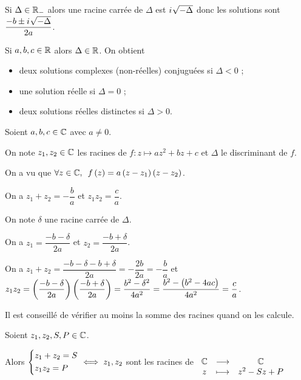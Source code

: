 \begin{rem}
Si \(\Delta\in\mathbb{R}_-\) alors une racine carrée de \(\Delta\) est \(i\mkern1mu\sqrt{-\Delta}\) donc les solutions sont \(\dfrac{-b\pm i\mkern1mu\sqrt{-\Delta}}{2a}\).
\end{rem}

\begin{rem}
Si \(a,b,c\in\mathbb{R}\) alors \(\Delta\in\mathbb{R}\). On obtient \begin{itemize}
\item deux solutions complexes (non-réelles) conjuguées si \(\Delta<0\) ;

\item une solution réelle si \(\Delta=0\) ;

\item deux solutions réelles distinctes si \(\Delta>0\).
\end{itemize}
\end{rem}

\begin{prop}
Soient \(a,b,c\in\mathbb{C}\) avec \(a\not=0\).

On note \(z_1,z_2\in\mathbb{C}\) les racines de \(f:z\mapsto az^2+bz+c\) et \(\Delta\) le discriminant de \(f\).

On a vu que \(\quantifs{\forall z\in\C}f\paren{z}=a\paren{z-z_1}\paren{z-z_2}\).

On a \(z_1+z_2=-\dfrac{b}{a}\) et \(z_1z_2=\dfrac{c}{a}\).
\end{prop}

\begin{dem}
On note \(\delta\) une racine carrée de \(\Delta\).

On a \(z_1=\dfrac{-b-\delta}{2a}\) et \(z_2=\dfrac{-b+\delta}{2a}\).

On a \(z_1+z_2=\dfrac{-b-\delta-b+\delta}{2a}=-\dfrac{2b}{2a}=-\dfrac{b}{a}\) et \(z_1z_2=\left(\dfrac{-b-\delta}{2a}\right)\left(\dfrac{-b+\delta}{2a}\right)=\dfrac{b^2-\delta^2}{4a^2}=\dfrac{b^2-\left(b^2-4ac\right)}{4a^2}=\dfrac{c}{a}\).
\end{dem}

\begin{rem}
Il est conseillé de vérifier au moins la somme des racines quand on les calcule.
\end{rem}

\begin{prop}
Soient \(z_1,z_2,S,P\in\mathbb{C}\).

Alors \(\begin{dcases}z_1+z_2=S \\ z_1z_2=P\end{dcases}\iff z_1,z_2\) sont les racines de \(\begin{array}[t]{ccc}\mathbb{C} & \longrightarrow & \mathbb{C} \\ z & \longmapsto & z^2-Sz+P\end{array}\)
\end{prop}

